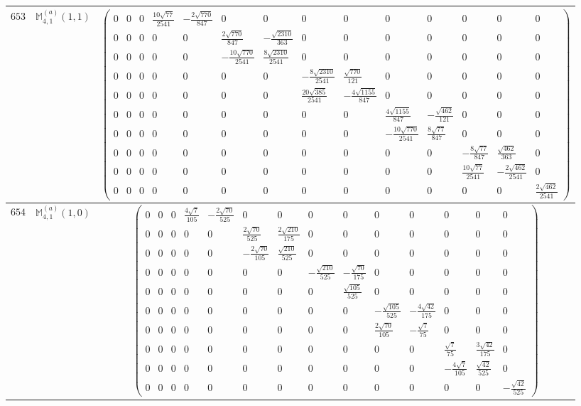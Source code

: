 \documentclass[fleqn,8pt,landscape]{jsarticle}
\begin{document}
\begin{center}
\begin{longtable}{ccc}
$ 653 $ & $ \mathbb{M}_{4,1}^{(a)}(1,1) $ & $ \begin{pmatrix} 0 & 0 & 0 & \frac{10 \sqrt{77}}{2541} & - \frac{2 \sqrt{770}}{847} & 0 & 0 & 0 & 0 & 0 & 0 & 0 & 0 & 0 \\ 0 & 0 & 0 & 0 & 0 & \frac{2 \sqrt{770}}{847} & - \frac{\sqrt{2310}}{363} & 0 & 0 & 0 & 0 & 0 & 0 & 0 \\ 0 & 0 & 0 & 0 & 0 & - \frac{10 \sqrt{770}}{2541} & \frac{8 \sqrt{2310}}{2541} & 0 & 0 & 0 & 0 & 0 & 0 & 0 \\ 0 & 0 & 0 & 0 & 0 & 0 & 0 & - \frac{8 \sqrt{2310}}{2541} & \frac{\sqrt{770}}{121} & 0 & 0 & 0 & 0 & 0 \\ 0 & 0 & 0 & 0 & 0 & 0 & 0 & \frac{20 \sqrt{385}}{2541} & - \frac{4 \sqrt{1155}}{847} & 0 & 0 & 0 & 0 & 0 \\ 0 & 0 & 0 & 0 & 0 & 0 & 0 & 0 & 0 & \frac{4 \sqrt{1155}}{847} & - \frac{\sqrt{462}}{121} & 0 & 0 & 0 \\ 0 & 0 & 0 & 0 & 0 & 0 & 0 & 0 & 0 & - \frac{10 \sqrt{770}}{2541} & \frac{8 \sqrt{77}}{847} & 0 & 0 & 0 \\ 0 & 0 & 0 & 0 & 0 & 0 & 0 & 0 & 0 & 0 & 0 & - \frac{8 \sqrt{77}}{847} & \frac{\sqrt{462}}{363} & 0 \\ 0 & 0 & 0 & 0 & 0 & 0 & 0 & 0 & 0 & 0 & 0 & \frac{10 \sqrt{77}}{2541} & - \frac{2 \sqrt{462}}{2541} & 0 \\ 0 & 0 & 0 & 0 & 0 & 0 & 0 & 0 & 0 & 0 & 0 & 0 & 0 & \frac{2 \sqrt{462}}{2541} \end{pmatrix} $ \\ \hline
$ 654 $ & $ \mathbb{M}_{4,1}^{(a)}(1,0) $ & $ \begin{pmatrix} 0 & 0 & 0 & \frac{4 \sqrt{7}}{105} & - \frac{2 \sqrt{70}}{525} & 0 & 0 & 0 & 0 & 0 & 0 & 0 & 0 & 0 \\ 0 & 0 & 0 & 0 & 0 & \frac{2 \sqrt{70}}{525} & \frac{2 \sqrt{210}}{175} & 0 & 0 & 0 & 0 & 0 & 0 & 0 \\ 0 & 0 & 0 & 0 & 0 & - \frac{2 \sqrt{70}}{105} & \frac{\sqrt{210}}{525} & 0 & 0 & 0 & 0 & 0 & 0 & 0 \\ 0 & 0 & 0 & 0 & 0 & 0 & 0 & - \frac{\sqrt{210}}{525} & - \frac{\sqrt{70}}{175} & 0 & 0 & 0 & 0 & 0 \\ 0 & 0 & 0 & 0 & 0 & 0 & 0 & 0 & \frac{\sqrt{105}}{525} & 0 & 0 & 0 & 0 & 0 \\ 0 & 0 & 0 & 0 & 0 & 0 & 0 & 0 & 0 & - \frac{\sqrt{105}}{525} & - \frac{4 \sqrt{42}}{175} & 0 & 0 & 0 \\ 0 & 0 & 0 & 0 & 0 & 0 & 0 & 0 & 0 & \frac{2 \sqrt{70}}{105} & - \frac{\sqrt{7}}{75} & 0 & 0 & 0 \\ 0 & 0 & 0 & 0 & 0 & 0 & 0 & 0 & 0 & 0 & 0 & \frac{\sqrt{7}}{75} & \frac{3 \sqrt{42}}{175} & 0 \\ 0 & 0 & 0 & 0 & 0 & 0 & 0 & 0 & 0 & 0 & 0 & - \frac{4 \sqrt{7}}{105} & \frac{\sqrt{42}}{525} & 0 \\ 0 & 0 & 0 & 0 & 0 & 0 & 0 & 0 & 0 & 0 & 0 & 0 & 0 & - \frac{\sqrt{42}}{525} \end{pmatrix} $ \\ \hline

\end{longtable}
\end{center}
\end{document}
